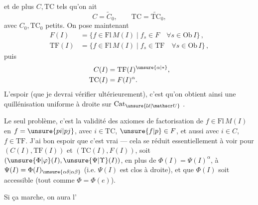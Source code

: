 et de plus  $C,\mathrm{TC}$  tels qu'on ait
\[
C=\widetilde{C}_0,\qquad \mathrm{TC}=\widetilde{\mathrm{TC}}_0,
\]
avec $C_0,\mathrm{TC}_0$ petits. On pose maintenant
\[
\begin{aligned}
F(I)&=\{f\in\mathrm{Fl}\,M(I)\mid f_s\in F\quad \forall s\in\mathrm{Ob}\,I\}\,,\\
\mathrm{TF}(I)&=\{f\in\mathrm{Fl}\,M(I)\mid f_s\in\mathrm{TF}\quad \forall s\in\mathrm{Ob}\,I\}\,,
\end{aligned}
\]
puis
\[
\begin{aligned}
C(I)&=\mathrm{TF}(I)^{\unsure{\alpha|\ast}},\\
\mathrm{TC}(I)&=F(I)^\alpha.
\end{aligned}
\]
L'espoir (que je devrai vérifier ultérieurement), c'est qu'on obtient ainsi une quillénisation uniforme à droite  sur $\mathrm{Cat}_{\unsure{\mathcal U|\mathscr U}}$ .

Le seul problème, c'est la validité des axiomes de factorisation de $f\in\mathrm{Fl}\,M(I)$ en $f=\unsure{pi|pj}$, avec $i\in\mathrm{TC}$, $\unsure{f|p}\in F$, et aussi avec $i\in C$, $f\in\mathrm{TF}$. J'ai bon espoir que c'est vrai --- cela se réduit essentiellement à voir pour $(C(I),\mathrm{TF}(I))$  et $(\mathrm{TC}(I),F(I))$,  soit $(\unsure{\Phi|\varphi}(I),\unsure{\Psi|\Upsilon}(I))$,  en plus de $\Phi(I)=\Psi(I)^\alpha$, à $\Psi(I)=\Phi(I)_{\unsure{\alpha\delta|\alpha\beta}}$ (i.e. $\Psi(I)$ est clos à droite), et que $\Phi(I)$ soit accessible (tout comme $\Phi=\Phi(e)$).

Si ça marche, on aura l'
